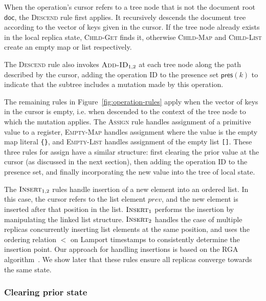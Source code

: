 \documentclass[10pt,journal,compsoc]{IEEEtran}
\begin{document}
When the operation's cursor refers to a tree node that is not the document root $\mathsf{doc}$, the \textsc{Descend} rule first applies. It recursively descends the document tree according to the vector of keys given in the cursor. If the tree node already exists in the local replica state, \textsc{Child-Get} finds it, otherwise \textsc{Child-Map} and \textsc{Child-List} create an empty map or list respectively.

The \textsc{Descend} rule also invokes $\textsc{Add-ID}_{1,2}$ at each tree node along the path described by the cursor, adding the operation ID to the presence set $\mathsf{pres}(k)$ to indicate that the subtree includes a mutation made by this operation.

The remaining rules in Figure~\ref{fig:operation-rules} apply when the vector of keys in the cursor is empty, i.e. when descended to the context of the tree node to which the mutation applies. The \textsc{Assign} rule handles assignment of a primitive value to a register, \textsc{Empty-Map} handles assignment where the value is the empty map literal \verb|{}|, and \textsc{Empty-List} handles assignment of the empty list \verb|[]|. These three rules for \textsf{assign} have a similar structure: first clearing the prior value at the cursor (as discussed in the next section), then adding the operation ID to the presence set, and finally incorporating the new value into the tree of local state.

The $\textsc{Insert}_{1,2}$ rules handle insertion of a new element into an ordered list. In this case, the cursor refers to the list element $\mathit{prev}$, and the new element is inserted after that position in the list. $\textsc{Insert}_1$ performs the insertion by manipulating the linked list structure. $\textsc{Insert}_2$ handles the case of multiple replicas concurrently inserting list elements at the same position, and uses the ordering relation $<$ on Lamport timestamps to consistently determine the insertion point. Our approach for handling insertions is based on the RGA algorithm~\cite{Roh:2011dw}. We show later that these rules ensure all replicas converge towards the same state.

\subsubsection{Clearing prior state}
\end{document}
